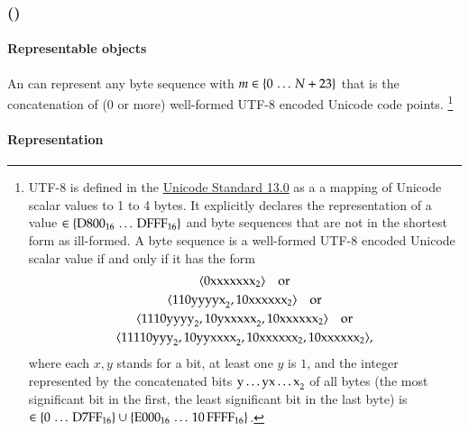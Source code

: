 \subsubsection{\DborUtfEightStringValue(\texorpdfstring{}{<b1, ..., bm>})}
\hypertarget{sec:def:Utf8StringValue}{}

\paragraph{Representable objects}

An \DborUtfEightStringValue{} can represent any byte sequence 
with $m \in \{0 \,\ldots\, N + 23\}$ that is the concatenation of ($0$ or more)
well-formed UTF-8 encoded Unicode code points.%
\footnote{
    UTF-8 is defined in the
    \href{https://www.unicode.org/versions/Unicode13.0.0/ch03.pdf\#G31703}{Unicode Standard 13.0}
    as a a mapping of Unicode scalar values to 1 to 4 bytes.
    It explicitly declares the representation of a value $\in \{\mathrm{D800}_{16} \,\ldots\, \mathrm{DFFF}_{16}\}$
    and byte sequences that are not in the shortest form as ill-formed.
    A byte sequence  is a well-formed UTF-8 encoded Unicode scalar value if and
    only if it has the form
    \begin{gather*}
        \langle \mathrm{0xxxxxxx}_{2} \rangle \quad\text{or} \\
        \langle \mathrm{110yyyyx}_{2}, \mathrm{10xxxxxx}_{2} \rangle \quad\text{or} \\
        \langle \mathrm{1110yyyy}_{2}, \mathrm{10yxxxxx}_{2}, \mathrm{10xxxxxx}_{2} \rangle \quad\text{or} \\
        \langle \mathrm{11110yyy}_{2}, \mathrm{10yyxxxx}_{2}, \mathrm{10xxxxxx}_{2}, \mathrm{10xxxxxx}_{2} \rangle,
    \end{gather*}
    where each $x, y$ stands for a bit, at least one $y$ is $1$, and the integer represented by
    the concatenated bits $\mathrm{y \ldots y x \ldots x}_{2}$ of all bytes
    (the most significant bit in the first, the least significant bit in the last byte) is
    $\in \{0 \,\ldots\, \mathrm{D7FF}_{16}\} \cup \{\mathrm{E000}_{16} \,\ldots\, \mathrm{10\,FFFF}_{16}\}$.
}

\paragraph{Representation}

